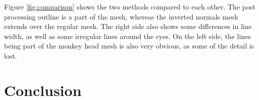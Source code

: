 \documentclass[paper=a4, fontsize=11pt]{scrartcl} %
\numberwithin{equation}{section} %
\numberwithin{figure}{section} %
\numberwithin{table}{section} %
\begin{document}
Figure \ref{fig:comparison} shows the two methods compared to each other. The post processing outline is a part of the mesh, whereas the inverted normals mesh extends over the regular mesh. The right side also shows some differences in line width, as well as some irregular lines around the eyes. On the left side, the lines being part of the monkey head mesh is also very obvious, as some of the detail is lost. 

\section{Conclusion}
\end{document}
